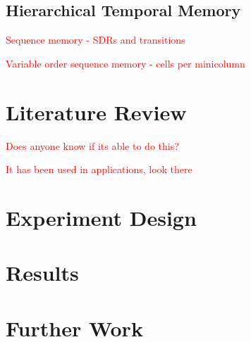 \documentclass[fleqn,minimal]{article}
\newcommand\blankpage{
	\pagebreak
	\ifthispageodd{\null
		\vfill
		\vfill
		\thispagestyle{empty}
		\clearpage}{}
}
\begin{document}
	\subsection{Hierarchical Temporal Memory}
	
	\textcolor{red}{Sequence memory - SDRs and transitions}
	
	\textcolor{red}{Variable order sequence memory - cells per minicolumn}
	
	\section{Literature Review}
	
	\textcolor{red}{Does anyone know if its able to do this?}
	
	\textcolor{red}{It has been used in applications, look there}
	
	\section{Experiment Design}
	
	\section{Results}
	
	\section{Further Work}
	
	
	\blankpage
	
	\nocite{*}  %
	{}
	
\end{document}
